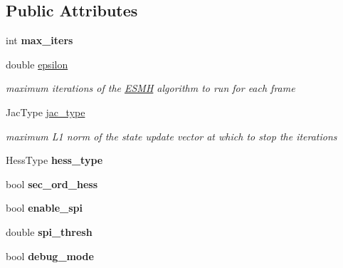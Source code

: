 \subsection*{Public Attributes}
\begin{DoxyCompactItemize}
\item 
\hypertarget{structESMHParams_a8f45f0d4af3d09955181b5d5b25ecae2}{int {\bfseries max\-\_\-iters}}\label{structESMHParams_a8f45f0d4af3d09955181b5d5b25ecae2}

\item 
\hypertarget{structESMHParams_aa8d2c4ca1b1d2cce26b10ee1a8e09b9d}{double \hyperlink{structESMHParams_aa8d2c4ca1b1d2cce26b10ee1a8e09b9d}{epsilon}}\label{structESMHParams_aa8d2c4ca1b1d2cce26b10ee1a8e09b9d}

\begin{DoxyCompactList}\small\item\em maximum iterations of the \hyperlink{classESMH}{E\-S\-M\-H} algorithm to run for each frame \end{DoxyCompactList}\item 
\hypertarget{structESMHParams_a9538b538978dc781dc77513615655aea}{Jac\-Type \hyperlink{structESMHParams_a9538b538978dc781dc77513615655aea}{jac\-\_\-type}}\label{structESMHParams_a9538b538978dc781dc77513615655aea}

\begin{DoxyCompactList}\small\item\em maximum L1 norm of the state update vector at which to stop the iterations \end{DoxyCompactList}\item 
\hypertarget{structESMHParams_a1dce2f640a33132ac0010c4cbf0820b9}{Hess\-Type {\bfseries hess\-\_\-type}}\label{structESMHParams_a1dce2f640a33132ac0010c4cbf0820b9}

\item 
\hypertarget{structESMHParams_a5c2afd807d9f69d32d6bf7d98c6ddfa5}{bool {\bfseries sec\-\_\-ord\-\_\-hess}}\label{structESMHParams_a5c2afd807d9f69d32d6bf7d98c6ddfa5}

\item 
\hypertarget{structESMHParams_a1486ac30f592f10f63b0f27293c01b70}{bool {\bfseries enable\-\_\-spi}}\label{structESMHParams_a1486ac30f592f10f63b0f27293c01b70}

\item 
\hypertarget{structESMHParams_a270fb82685b55161011b6cc22d106e64}{double {\bfseries spi\-\_\-thresh}}\label{structESMHParams_a270fb82685b55161011b6cc22d106e64}

\item 
\hypertarget{structESMHParams_ad7f8a1b911f8df3f2b5c3ce4c31e9d4e}{bool {\bfseries debug\-\_\-mode}}\label{structESMHParams_ad7f8a1b911f8df3f2b5c3ce4c31e9d4e}

\end{DoxyCompactItemize}


